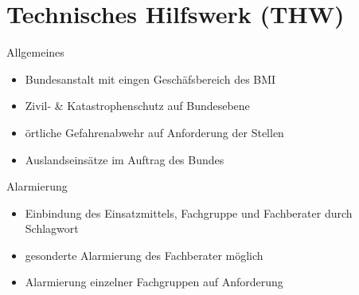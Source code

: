 \section{Technisches Hilfswerk (THW)}
\begin{sectionbox}{Allgemeines}
    \begin{itemize}
        \item Bundesanstalt mit eingen Geschäfsbereich des BMI
        \item Zivil- \& Katastrophenschutz auf Bundesebene
        \item örtliche Gefahrenabwehr auf Anforderung der Stellen
        \item Auslandseinsätze im Auftrag des Bundes
    \end{itemize}
\end{sectionbox}
\begin{sectionbox}{Alarmierung}
    \begin{itemize}
        \item Einbindung des Einsatzmittels, Fachgruppe und Fachberater durch Schlagwort
        \item gesonderte Alarmierung des Fachberater möglich
        \item Alarmierung einzelner Fachgruppen auf Anforderung
    \end{itemize}
\end{sectionbox}
